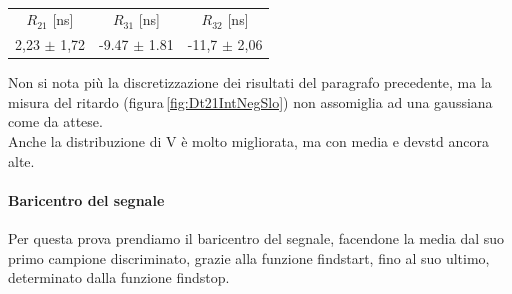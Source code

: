 \documentclass[a4paper,twocolumn]{article}
\begin{document}
\begin{table}[H]
\begin{tabular}{c|c|c}
$R_{21}$ [ns] & $R_{31}$ [ns] & $R_{32}$ [ns] \\
\hfill
2,23 $\pm$ 1,72 & -9.47 $\pm$ 1.81 & -11,7 $\pm$ 2,06
\hfill
\end{tabular}
\caption{}
\label{tab:RitIntNegSlo}
\end{table}

Non si nota più la discretizzazione dei risultati del paragrafo precedente, ma la misura del ritardo (figura\,\ref{fig:Dt21IntNegSlo}) non assomiglia ad una gaussiana come da attese.\\
Anche la distribuzione di V è molto migliorata, ma con media e devstd ancora alte.

\paragraph{Baricentro del segnale}
Per questa prova prendiamo il baricentro del segnale, facendone la media dal suo primo campione discriminato, grazie alla funzione findstart, fino al suo ultimo, determinato dalla funzione findstop.
\end{document}
